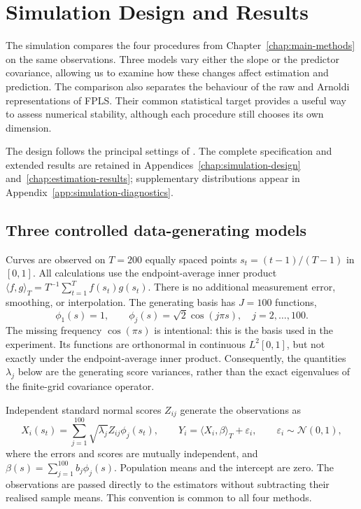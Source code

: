 \chapter{Simulation Design and Results}
\label{chap:main-simulation}

The simulation compares the four procedures from
Chapter~\ref{chap:main-methods} on the same observations. Three models vary
either the slope or the predictor covariance, allowing us to examine how
these changes affect estimation and prediction. The comparison also separates
the behaviour of the raw and Arnoldi representations of FPLS. Their common
statistical target provides a useful way to assess numerical stability,
although each procedure still chooses its own dimension.

The design follows the principal settings of
\textcite{babii_carrasco_tsafack_2026}. The complete specification and extended
results are retained in Appendices~\ref{chap:simulation-design}
and~\ref{chap:estimation-results}; supplementary distributions appear in
Appendix~\ref{app:simulation-diagnostics}.

\section{Three controlled data-generating models}
\label{main:sec:simulation-design}

Curves are observed on $T=200$ equally spaced points
$s_t=(t-1)/(T-1)$ in $[0,1]$. All calculations use the endpoint-average inner
product $\langle f,g\rangle_T=T^{-1}\sum_{t=1}^T f(s_t)g(s_t)$.
There is no additional measurement error, smoothing, or interpolation.
The generating basis has $J=100$ functions,
\begin{equation}
    \phi_1(s)=1,\qquad
    \phi_j(s)=\sqrt{2}\cos(j\pi s),\quad j=2,\ldots,100.
    \label{main:eq:simulation-basis}
\end{equation}
The missing frequency $\cos(\pi s)$ is intentional: this is the basis used
in the experiment. Its functions are orthonormal in continuous $L^2[0,1]$,
but not exactly under the endpoint-average inner product. Consequently,
the quantities $\lambda_j$ below are the generating score variances, rather
than the exact eigenvalues of the finite-grid covariance operator.

Independent standard normal scores $Z_{ij}$ generate the observations as
\begin{equation}
    X_i(s_t)=\sum_{j=1}^{100}\sqrt{\lambda_j}Z_{ij}\phi_j(s_t),
    \qquad
    Y_i=\langle X_i,\beta\rangle_T+\varepsilon_i,
    \qquad \varepsilon_i\sim\mathcal N(0,1),
    \label{main:eq:simulation-dgp}
\end{equation}
where the errors and scores are mutually independent, and
$\beta(s)=\sum_{j=1}^{100}b_j\phi_j(s)$. Population means and the intercept
are zero. The observations are passed directly to the estimators without
subtracting their realised sample means. This convention is common to all
four methods.

